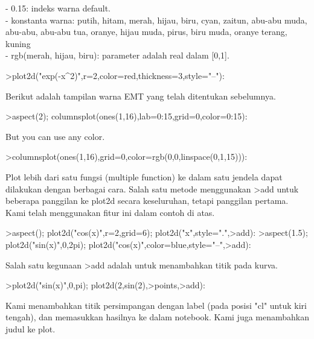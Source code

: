 \documentclass[a4paper,10pt]{article}
\begin{document}
\begin{eulernotebook}
\begin{eulercomment}
\begin{eulercomment}
\begin{eulercomment}
\begin{eulercomment}
\begin{eulercomment}
\begin{eulercomment}
\begin{eulercomment}
- 0.15: indeks warna default.\\
- konstanta warna: putih, hitam, merah, hijau, biru, cyan, zaitun,
abu-abu muda, abu-abu, abu-abu tua, oranye, hijau muda, pirus, biru
muda, oranye terang, kuning\\
- rgb(merah, hijau, biru): parameter adalah real dalam [0,1].
\end{eulercomment}
\begin{eulerprompt}
>plot2d("exp(-x^2)",r=2,color=red,thickness=3,style="--"):
\end{eulerprompt}
\begin{eulercomment}
Berikut adalah tampilan warna EMT yang telah ditentukan sebelumnya.
\end{eulercomment}
\begin{eulerprompt}
>aspect(2); columnsplot(ones(1,16),lab=0:15,grid=0,color=0:15):
\end{eulerprompt}
\begin{eulercomment}
But you can use any color.
\end{eulercomment}
\begin{eulerprompt}
>columnsplot(ones(1,16),grid=0,color=rgb(0,0,linspace(0,1,15))):
\end{eulerprompt}
\begin{eulercomment}
Plot lebih dari satu fungsi (multiple function) ke dalam satu jendela
dapat dilakukan dengan berbagai cara. Salah satu metode menggunakan
\textgreater{}add untuk beberapa panggilan ke plot2d secara keseluruhan, tetapi
panggilan pertama. Kami telah menggunakan fitur ini dalam contoh di
atas.
\end{eulercomment}
\begin{eulerprompt}
>aspect(); plot2d("cos(x)",r=2,grid=6); plot2d("x",style=".",>add):
>aspect(1.5); plot2d("sin(x)",0,2pi); plot2d("cos(x)",color=blue,style="--",>add):
\end{eulerprompt}
\begin{eulercomment}
Salah satu kegunaan \textgreater{}add adalah untuk menambahkan titik pada kurva.
\end{eulercomment}
\begin{eulerprompt}
>plot2d("sin(x)",0,pi); plot2d(2,sin(2),>points,>add):
\end{eulerprompt}
\begin{eulercomment}
Kami menambahkan titik persimpangan dengan label (pada posisi "cl"
untuk kiri tengah), dan memasukkan hasilnya ke dalam notebook. Kami
juga menambahkan judul ke plot.

\end{eulercomment}
\end{eulercomment}
\end{eulercomment}
\end{eulercomment}
\end{eulercomment}
\end{eulercomment}
\end{eulercomment}
\end{eulernotebook}
\end{document}
